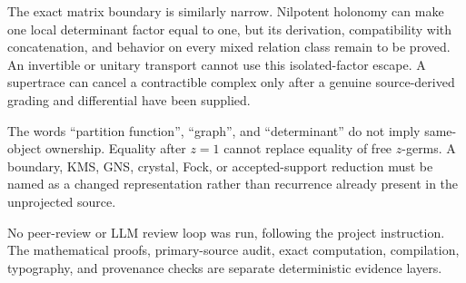 The exact matrix boundary is similarly narrow.  Nilpotent holonomy can make
one local determinant factor equal to one, but its derivation, compatibility
with concatenation, and behavior on every mixed relation class remain to be
proved.  An invertible or unitary transport cannot use this isolated-factor
escape.  A supertrace can cancel a contractible complex only after a genuine
source-derived grading and differential have been supplied.

The words ``partition function'', ``graph'', and ``determinant'' do not imply
same-object ownership.  Equality after $z=1$ cannot replace equality of free
$z$-germs.  A boundary, KMS, GNS, crystal, Fock, or accepted-support reduction
must be named as a changed representation rather than recurrence already
present in the unprojected source.

No peer-review or LLM review loop was run, following the project instruction.
The mathematical proofs, primary-source audit, exact computation,
compilation, typography, and provenance checks are separate deterministic
evidence layers.
